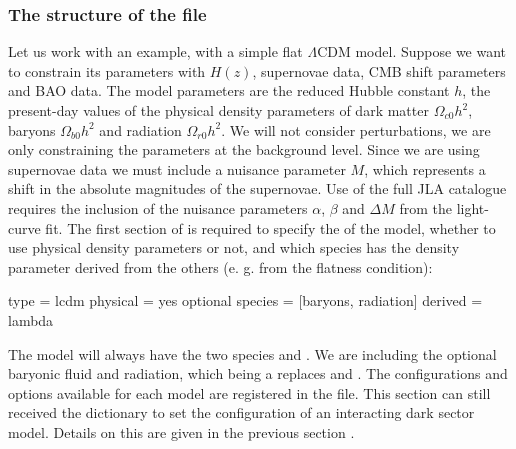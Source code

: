 \documentclass[letterpaper,12pt,english]{sphinxhowto}
\begin{document}
\subsubsection{The structure of the  file}
\label{\detokenize{beforestart:the-structure-of-the-ini-file}}
Let us work with an example, with a simple flat \(\Lambda\text{CDM}\) model.
Suppose we want to constrain its parameters with \(H(z)\), supernovae data,
CMB shift parameters and BAO data.
The model parameters are the reduced Hubble constant \(h\), the present-day
values of the physical density parameters of dark matter \(\Omega_{c0} h^2\),
baryons \(\Omega_{b0} h^2\) and radiation \(\Omega_{r0} h^2\).
We will not consider perturbations, we are only constraining the parameters at
the background level.
Since we are using supernovae data we must include a nuisance parameter
\(M\), which represents a shift in the absolute magnitudes of the
supernovae.
Use of the full JLA catalogue requires the inclusion of the nuisance parameters
\(\alpha\), \(\beta\) and \(\Delta M\) from the light-curve fit.
The first section of  is required to specify the  of the model,
whether to use physical density parameters or not, and which species has the
density parameter derived from the others (e. g. from the flatness condition):

%
\begin{sphinxVerbatim}[commandchars=\\\{\}]
[model]
type = lcdm
physical = yes
optional species = [\PYGZsq{}baryons\PYGZsq{}, \PYGZsq{}radiation\PYGZsq{}]
derived = lambda
\end{sphinxVerbatim}

The  model will always have the two species  and .
We are including the optional baryonic fluid and radiation, which being a
 replaces  and .
The configurations and options available for each model are registered in the
 file.
This section can still received the  dictionary to set the
configuration of an interacting dark sector model.
Details on this are given in the previous section {\hyperref[\detokenize{themodels:int-models}]{}}.
\end{document}
